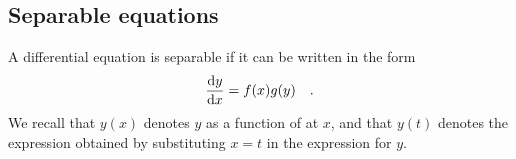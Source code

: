 \documentclass[12pt]{book}
\renewcommand{\optionalDisplay}[1]{}
\begin{document}
\optionalDisplay{
\begin{pspicture}(-6,-1)(6,6)
\psaxes{<->}(0,0)(-6,-1)(6,6)
\rput (5,5){The direction field $\frac{\diff y}{\diff x}=-\frac{x}{y}$}
\fcDirectionFieldFull{x y div -1 mul}{-4}{0.001}{0.5}{17}{8}{0.2}{0.02}{linecolor=blue}%
\end{pspicture}
} %

\subsection{Separable equations} \label{secSeparableDFQs}
A differential equation is separable if it can be written in the form
\begin{equation}\label{eqDFQSeparable}
\frac{{\normalfont \text{d}} y}{{\normalfont \text{d}} x}= f(x)g(y)\quad .
\end{equation}
We recall that $y(x)$ denotes $y$ as a function of at $x$, and that $y(t)$ denotes the expression obtained by substituting $x=t$ in the expression for $y$.
\end{document}
